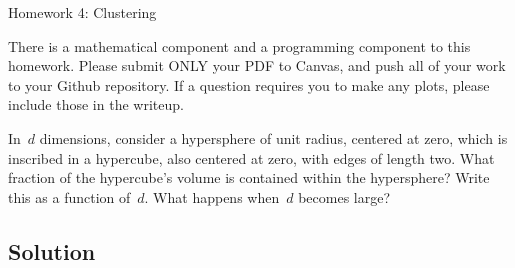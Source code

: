 \documentclass[submit]{harvardml}
\begin{document}
\begin{center}
{\Large Homework 4: Clustering}\\
\end{center}

There is a mathematical component and a programming component to this homework.
Please submit ONLY your PDF to Canvas, and push all of your work to your Github
repository. If a question requires you to make any plots, please
include those in the writeup.


\begin{problem}
In~$d$ dimensions, consider a hypersphere of unit radius, centered at zero,
which is inscribed in a hypercube, also centered at zero, with edges of length
two.  What fraction of the hypercube's volume is contained within the
hypersphere?  Write this as a function of~$d$.  What happens when~$d$ becomes
large?
\end{problem}
\subsection*{Solution}
\end{document}
